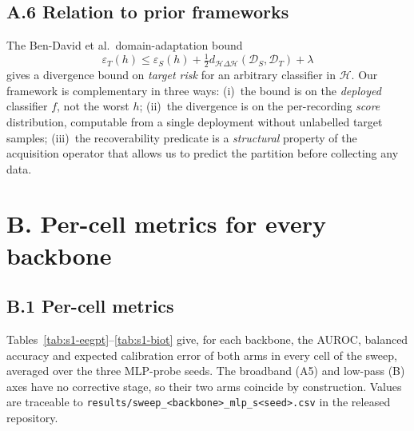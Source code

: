 \documentclass[conference]{IEEEtran}
\begin{document}
\subsection*{A.6 Relation to prior frameworks}
The Ben-David et al.\ domain-adaptation bound~\cite{bendavid2010theory}
\[
\varepsilon_T(h) \le \varepsilon_S(h) +
\tfrac{1}{2} d_{\mathcal{H}\Delta\mathcal{H}}(\mathcal{D}_S, \mathcal{D}_T) +
\lambda
\]
gives a divergence bound on \emph{target risk} for an arbitrary
classifier in $\mathcal{H}$. Our framework is complementary in three
ways: (i)~the bound is on the \emph{deployed} classifier $f$, not the
worst $h$; (ii)~the divergence is on the per-recording \emph{score}
distribution, computable from a single deployment without unlabelled
target samples; (iii)~the recoverability predicate is a
\emph{structural} property of the acquisition operator that allows us
to predict the partition before collecting any data.


\section*{B. Per-cell metrics for every backbone}
\subsection*{B.1 Per-cell metrics}
Tables~\ref{tab:s1-eegpt}--\ref{tab:s1-biot} give, for each backbone,
the AUROC, balanced accuracy and expected calibration error of both
arms in every cell of the sweep, averaged over the three MLP-probe
seeds. The broadband (A5) and low-pass (B) axes have no corrective
stage, so their two arms coincide by construction. Values are
traceable to \texttt{results/sweep\_<backbone>\_mlp\_s<seed>.csv} in
the released repository.

\begin{table}[htbp]
\caption{EEGPT: per-cell metrics, mean over MLP seeds 7/11/13.}
\label{tab:s1-eegpt}
\centering\footnotesize\setlength{\tabcolsep}{3pt}
\end{table}

\begin{table}[htbp]
\caption{LaBraM: per-cell metrics, mean over MLP seeds 7/11/13.}
\label{tab:s1-labram}
\centering\footnotesize\setlength{\tabcolsep}{3pt}
\end{table}
\end{document}
